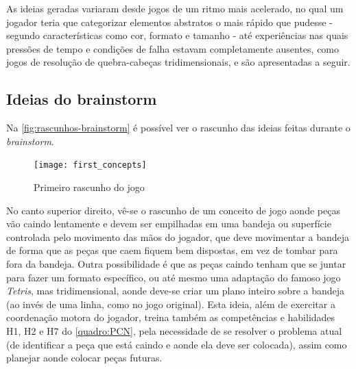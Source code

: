 As ideias geradas variaram desde jogos de um ritmo mais acelerado, no qual 
um jogador teria que categorizar elementos abstratos o mais rápido que 
pudesse - segundo características como cor, formato e tamanho - até experiências 
nas quais pressões de tempo e condições de falha estavam completamente 
ausentes, como jogos de resolução de quebra-cabeças tridimensionais, 
e são apresentadas a seguir.

\subsection{Ideias do brainstorm}\label{subsec-ideias-brainstorm}

Na \autoref{fig:rascunhos-brainstorm} é possível ver o rascunho das ideias feitas durante o \textit{brainstorm}. 

\begin{figure}[h]
	\centering
	\caption{Primeiro rascunho do jogo}
	\texttt{[image: first\_concepts]}
	\legend{\fonteAP}
	\label{fig:rascunhos-brainstorm}
\end{figure}

No canto superior direito, vê-se o rascunho de um conceito de jogo aonde 
peças vão caindo lentamente e devem ser empilhadas em uma bandeja ou 
superfície controlada pelo movimento das mãos do jogador, que deve 
movimentar a bandeja de forma que as peças que caem fiquem bem dispostas, 
em vez de tombar para fora da bandeja. Outra possibilidade é que as 
peças caindo tenham que se juntar para fazer um formato específico, 
ou até mesmo uma adaptação do famoso jogo \textit{Tetris}, mas 
tridimensional, aonde deve-se criar um plano inteiro sobre a bandeja 
(ao invés de uma linha, como no jogo original). Esta ideia, além de
exercitar a coordenação motora do jogador, treina também as 
competências e habilidades H1, H2 e H7 do \autoref{quadro:PCN}, pela
necessidade de se resolver o problema atual (de identificar a 
peça que está caindo e aonde ela deve ser colocada), assim como planejar
aonde colocar peças futuras.

